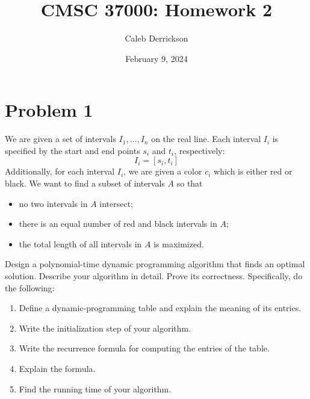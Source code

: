 

\title{CMSC 37000: Homework 2}
\author{Caleb Derrickson}
\date{February 9, 2024}

\usetikzlibrary{positioning, arrows.meta, bending}


\onehalfspacing
\maketitle
\allowdisplaybreaks


\tableofcontents

\newpage
\section{Problem 1}
We are given a set of intervals $I_1, ..., I_n$ on the real line. Each interval $I_i$ is specified by the start and end points $s_i$ and $t_i$, respectively:
\[I_i = [s_i, t_i]\]
Additionally, for each interval $I_i$, we are given a color $c_i$ which is either red or black. We want to find a subset of intervals $A$ so that 
\begin{itemize}[$\bullet$]
    \item no two intervals in $A$ intersect;
    \item there is an equal number of red and black intervals in $A$;
    \item the total length of all intervals in $A$ is maximized.
\end{itemize}
Design a polynomial-time dynamic programming algorithm that finds an optimal solution. Describe your algorithm in detail. Prove its correctness. Specifically, do the following:
\begin{enumerate}
    \item Define a dynamic-programming table and explain the meaning of its entries.
    \item Write the initialization step of your algorithm.
    \item Write the recurrence formula for computing the entries of the table.
    \item Explain the formula.
    \item Find the running time of your algorithm.
\end{enumerate}
\newpage
